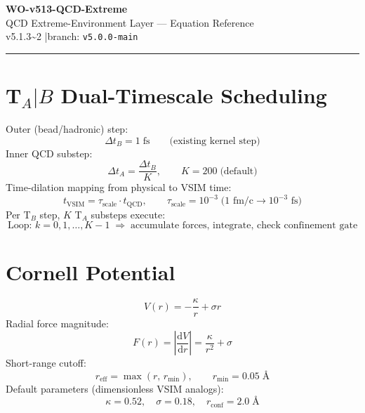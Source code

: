 \documentclass[10pt, a4paper, oneside]{article}
\begin{document}
\begin{center}
  {\LARGE\bfseries WO-v513-QCD-Extreme}\\[0.3em]
  {\large QCD Extreme-Environment Layer --- Equation Reference}\\[0.5em]
  {\small v5.1.3{\textasciitilde}2 \quad|\quad branch: \texttt{v5.0.0-main}}
\end{center}
\vspace{0.5em}\hrule\vspace{1em}

\section{T\texorpdfstring{$_A|B$}{A|B} Dual-Timescale Scheduling}

\noindent Outer (bead/hadronic) step:
\begin{equation}
  \Delta t_B = 1\;\mathrm{fs} \qquad \text{(existing kernel step)}
\end{equation}
Inner QCD substep:
\begin{equation}
  \Delta t_A = \frac{\Delta t_B}{K}, \qquad K = 200 \;\text{(default)}
\end{equation}
Time-dilation mapping from physical to VSIM time:
\begin{equation}
  t_{\mathrm{VSIM}} = \tau_{\mathrm{scale}} \cdot t_{\mathrm{QCD}},
  \qquad \tau_{\mathrm{scale}} = 10^{-3} \;\text{(1 fm/c} \to 10^{-3}\text{ fs)}
\end{equation}
Per T$_B$ step, $K$ T$_A$ substeps execute:
\begin{equation}
  \text{Loop: } k = 0,1,\ldots,K-1 \;\Rightarrow\; \text{accumulate forces,
  integrate, check confinement gate}
\end{equation}

\section{Cornell Potential}

\begin{equation}
  \boxed{V(r) = -\frac{\kappa}{r} + \sigma r}
\end{equation}
Radial force magnitude:
\begin{equation}
  F(r) = \left|\frac{\mathrm{d}V}{\mathrm{d}r}\right| = \frac{\kappa}{r^2} + \sigma
\end{equation}
Short-range cutoff:
\begin{equation}
  r_{\mathrm{eff}} = \max(r,\, r_{\min}), \qquad r_{\min} = 0.05\;\text{\AA{}}
\end{equation}
Default parameters (dimensionless VSIM analogs):
\begin{equation}
  \kappa = 0.52, \quad \sigma = 0.18, \quad r_{\mathrm{conf}} = 2.0\;\text{\AA{}}
\end{equation}
\end{document}
